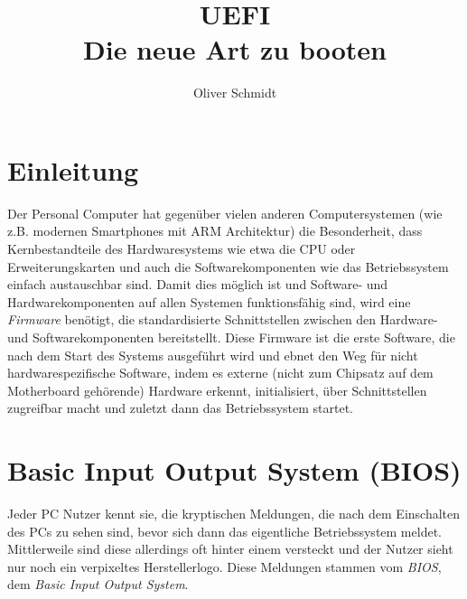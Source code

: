 \documentclass[12pt,ngerman,twopage]{scrartcl}
\title{UEFI\\{\large Die neue Art zu booten}}
\date{\datum}
\author{Oliver Schmidt}
\begin{document}
\maketitle
\tableofcontents
\clearpage

\twocolumn
\section{Einleitung}
Der Personal Computer hat gegenüber vielen anderen Computersystemen (wie z.B. modernen Smartphones mit ARM Architektur) die Besonderheit, dass Kernbestandteile des Hardwaresystems wie etwa die CPU oder Erweiterungskarten und auch die Softwarekomponenten wie das Betriebssystem einfach austauschbar sind. Damit dies möglich ist und Software- und Hardwarekomponenten auf allen Systemen funktionsfähig sind, wird eine \textit{Firmware} benötigt, die standardisierte Schnittstellen zwischen den Hardware- und Softwarekomponenten bereitstellt. Diese Firmware ist die erste Software, die nach dem Start des Systems ausgeführt wird und ebnet den Weg für nicht hardwarespezifische Software, indem es externe (nicht zum Chipsatz auf dem Motherboard gehörende) Hardware erkennt, initialisiert, über Schnittstellen  zugreifbar macht und zuletzt dann das Betriebssystem startet.
\section{Basic Input Output System (BIOS)}
Jeder PC Nutzer kennt sie, die kryptischen Meldungen, die nach dem Einschalten des PCs zu sehen sind, bevor sich dann das eigentliche Betriebssystem meldet. Mittlerweile sind diese allerdings oft hinter einem versteckt und der Nutzer sieht nur noch ein verpixeltes Herstellerlogo. Diese Meldungen stammen vom \textit{BIOS}, dem \textit{Basic Input Output System}.
\end{document}
